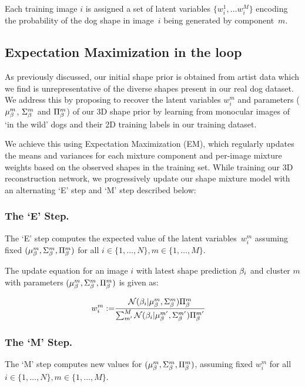   Each training image $i$ is assigned a set of latent variables $\{w_{i}^{1}, \dots w_{i}^{M}\}$ encoding the probability of the dog shape in image~$i$ being generated by component~$m$. 
  
  \subsection{Expectation Maximization in the loop}
  
  As previously discussed, our initial shape prior is obtained from artist data which we find is unrepresentative of the diverse shapes present in our real dog dataset. We address this by proposing to recover the latent variables $w_{i}^{m}$ and parameters ($\mu_{\beta}^{m}$, $\Sigma_{\beta}^{m}$ and $\Pi_{\beta}^{m}$) of our 3D shape prior by learning from monocular images of `in the wild' dogs and their 2D training labels in our training dataset.
  
  We achieve this using Expectation Maximization (EM), which regularly updates the means and variances for each mixture component and per-image mixture weights based on the observed shapes in the training set. While training our 3D reconstruction network, we progressively update our shape mixture model with an alternating `E' step and `M' step described below:
  
  \subsubsection{The `E' Step.}
  The `E' step computes the expected value of the latent variables~$w_{i}^{m}$ 
  assuming fixed $(\mu_{\beta}^{m}, \Sigma_{\beta}^{m}, \Pi_{\beta}^{m})$ for all $i \in \{1,\dots,N\}, m \in \{1,\dots,M\}$.
  
  The update equation for an image $i$ with latest shape prediction $\beta_{i}$ 
  and cluster $m$ with parameters $(\mu_{\beta}^{m}, \Sigma_{\beta}^{m}, \Pi_{\beta}^{m})$ 
  is given as:
  
  \begin{align}
      w_{i}^{m} 
      :=& 
      \frac{
          \mathcal{N}(\beta_{i} | \mu_{\beta}^{m},\Sigma_{\beta}^{m})\Pi_{\beta}^{m}
      }
      {
          \sum_{m'}^{M}
          \mathcal{N}(\beta_{i} | \mu_{\beta}^{m'},\Sigma_{\beta}^{m'})\Pi_{\beta}^{m'}
      }
  \end{align}
  
  
  
  \subsubsection{The `M' Step.}
  The `M' step computes new values for $(\mu_{\beta}^{m}, \Sigma_{\beta}^{m}, \Pi_{\beta}^{m})$, assuming fixed $w_{i}^{m}$ for all $i \in \{1,\dots,N\}, m \in \{1,\dots,M\}$.
  

